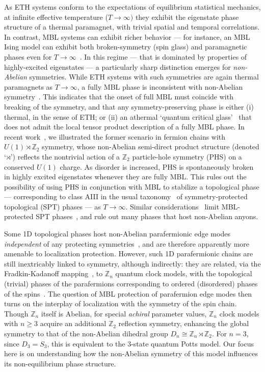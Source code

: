 \documentclass[prb,aps, twocolumn, superscriptaddress]{revtex4-1}
\begin{document}
As ETH systems conform to the expectations of equilibrium statistical mechanics, at infinite effective temperature ($T\rightarrow \infty)$ they exhibit the  eigenstate phase structure of a thermal paramagnet, 
with trivial spatial and temporal correlations. In contrast, MBL systems can exhibit richer behavior --- for instance, an MBL Ising model can exhibit both
broken-symmetry (spin glass) and paramagnetic phases even for $T\rightarrow \infty$~\cite{HuseMBLQuantumOrder,PhysRevLett.112.217204,KjallIsing,PekkerRSRGX}. 
In this regime --- that is dominated by properties of highly-excited eigenstates --- a particularly sharp distinction emerges for {\it non-Abelian} symmetries. While ETH systems with such symmetries are again thermal paramagnets as $T\rightarrow\infty$, a fully MBL phase is inconsistent with non-Abelian symmetry~\cite{PhysRevB.94.224206}.  This indicates that the onset of full MBL must coincide with breaking of the symmetry, and that any symmetry-preserving phase is either (i) thermal, in the sense of ETH; or (ii) an athermal `quantum critical glass'~\cite{QCGPRL} that does not admit the local tensor product description of a fully MBL phase.
In recent work~\cite{XXZPaper}, we illustrated 
the former scenario in fermion chains with $U(1)\rtimes {\mathbb{Z}_2}$ symmetry, whose non-Abelian semi-direct product structure (denoted `$\rtimes$') reflects the nontrivial action of a ${\mathbb{Z}_2}$ particle-hole symmetry (PHS) on a conserved $U(1)$ charge. As disorder is increased, PHS is spontaneously broken in highly excited eigenstates whenever they are fully MBL. 
This rules out the possibility of using PHS in conjunction with MBL to stabilize a  topological phase --- corresponding to class AIII in the usual taxonomy~\cite{PerioTableSchnyder, PerioTableKitaev} of symmetry-protected topological (SPT) phases --- as $T\rightarrow \infty$. Similar considerations~\cite{PhysRevB.94.224206} limit MBL-protected SPT phases~\cite{PhysRevB.89.144201,BahriMBLSPT,CenkeMBLSPT,ACPMBLSPT}, and rule out many phases that host non-Abelian anyons.


Some 1D  topological phases host non-Abelian parafermionic edge modes {\it independent} of any protecting symmetries~\cite{AliceaFendleyReview}, and are therefore apparently more amenable to localization protection. However, such 1D parafermionic chains are still inextricably linked to symmetry, although indirectly: they are related, via the Fradkin-Kadanoff mapping~\cite{FRADKIN19801}, to $\mathbb{Z}_n$ quantum clock models, with the topological (trivial) phases of the parafermions corresponding to ordered (disordered) phases of the spins~\cite{AliceaFendleyReview}. The question of MBL protection of parafermion edge modes then turns on the interplay of localization with the symmetry of the spin chain.  Though $\mathbb{Z}_n$ itself is Abelian, for special {\it achiral} parameter values, ${\mathbb{Z}_n}$ clock models with $n\geq 3$ acquire an additional ${\mathbb{Z}_2}$ reflection symmetry, enhancing the global symmetry to that of the non-Abelian dihedral group $D_n \cong {\mathbb{Z}_n} \rtimes {\mathbb{Z}_2}$. For $n=3$, since $D_3 = S_3$, this is equivalent to the 3-state quantum Potts model. Our focus here is on understanding how the non-Abelian  symmetry of this model influences its non-equilibrium phase structure.
\end{document}
